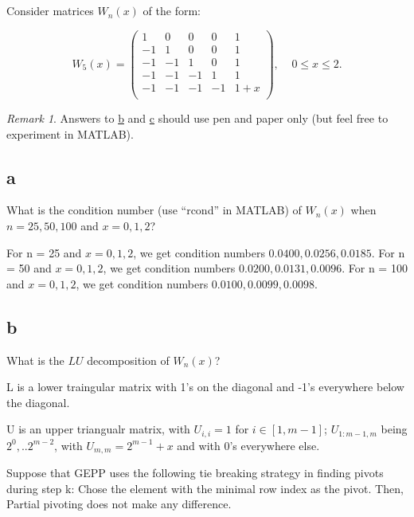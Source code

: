 \documentclass[10pt]{amsart}
\theoremstyle{remark}
\newtheorem{rem}[thm]{Remark}
\begin{document}
\section{}
Consider matrices $W_{n}(x)$
of the form:

$$W_{5}(x) =
  \left( \begin{array}{rrrrc} 
  1  &  0 &  0 &  0 & 1   \\
  -1 &  1 &  0 &  0 & 1   \\
  -1 & -1 &  1 &  0 & 1   \\
  -1 & -1 & -1 &  1 & 1   \\
  -1 & -1 & -1 & -1 & 1+x \\
  \end{array} \right),  \;\;\;\;
  0 \leq x \leq 2.
$$

\begin{rem}
Answers to \underline{b} and \underline{c} should use pen and
paper only (but feel free to experiment in MATLAB).
\end{rem}

\subsection{a}
  What is the condition number (use ``rcond'' in
  MATLAB) of $W_{n}(x)$ when $n = 25, 50, 100$ and $x = 0, 1, 2$?

For n = 25 and  $x = 0, 1, 2$, we get condition numbers $0.0400, 0.0256, 0.0185$.
For n = 50 and  $x = 0, 1, 2$, we get condition numbers $0.0200, 0.0131, 0.0096$.
For n = 100 and  $x = 0, 1, 2$, we get condition numbers $0.0100, 0.0099, 0.0098$.

\subsection{b}
What is the $LU$ decomposition of $W_{n}(x)$?

L is a lower traingular matrix with 1's on the diagonal and -1's everywhere below the diagonal.

U is an upper triangualr matrix, with $U_{i,i} = 1$ for $i \in [1,m-1]$; $U_{1:m-1,m}$ being $2^{0}, .. 2^{m-2}$, with $U_{m,m} = 2^{m-1} + x$ and with 0's everywhere else.


Suppose that GEPP uses the following tie breaking strategy in finding pivots during step k: Chose the element with the minimal row index as the pivot. Then, Partial pivoting does not make any difference.
\end{document}
